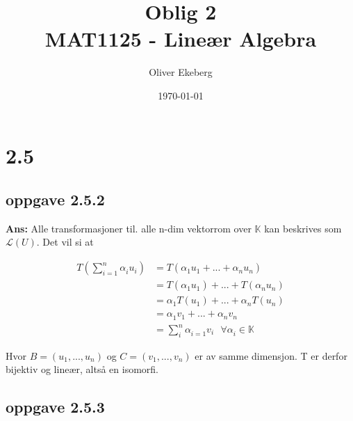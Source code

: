 \documentclass[11pt]{article}
\title{Oblig 2 \\ MAT1125 - Lineær Algebra}
\author{Oliver Ekeberg}
\date{\today}
\newenvironment{solbox}
  {\begin{mdframed}[linewidth=1pt,linecolor=black,roundcorner=5pt]
   \noindent\textbf{Ans: }\enspace}
  {\end{mdframed}}
\begin{document}
\maketitle


\tableofcontents


\section{2.5}

\subsection{oppgave 2.5.2}

\begin{solbox}
  Alle transformasjoner til. alle n-dim vektorrom over $ \mathbb{K} $ kan beskrives som $ \mathcal{ L }(U) $. Det vil si at 
  
  \begin{align*}
    T(\sum_{ i=1 }^{ n } \alpha_{i}^{} u_i) &= T( \alpha_{1}^{}  u_1+...+ \alpha_{n}^{}  u_n) \\
    &= T( \alpha_{1}^{} u_1) + ... + T(\alpha_{n}^{} u_n) \\
    &= \alpha_{1}^{} T(u_1) + ... + \alpha_{n}^{} T(u_n) \\
    &= \alpha_{1}^{} v_1 + ... + \alpha_{n}^{} v_n \\
    &= \sum_{ i }^{ n } \alpha_{i=1}^{} v_i \text{ $\forall \alpha_{i}^{} \in \mathbb{K} $}
  \end{align*}

  Hvor $ B= \left( u_1, ..., u_n \right)  $ og $ C = \left( v_1, ..., v_n \right)  $ er av samme dimensjon. T er derfor bijektiv og lineær, altså en isomorfi.
  
\end{solbox}


\subsection{oppgave 2.5.3}
\end{document}
